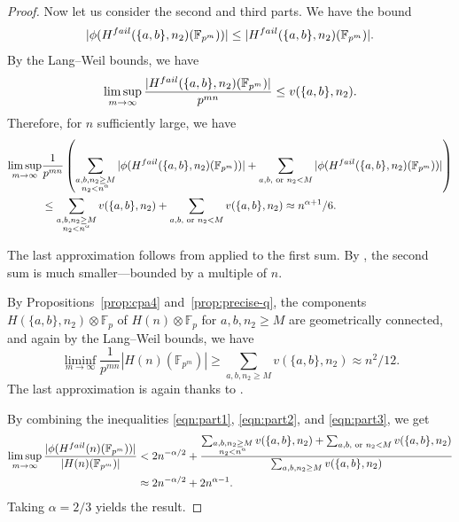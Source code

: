 \documentclass[10pt,a4paper]{amsart}
\newcommand\FF{\mathbb{F}}
\begin{document}
\begin{proof}
  Now let us consider the second and third parts.
  We have the bound
  \[|\phi (H^{\rm fail}(\{a,b\},n_2)(\FF_{p^m}))| \leq |H^{\rm fail}(\{a,b\},n_2)(\FF_{p^m})|.\]
  By the Lang--Weil bounds, we have
  \[ \limsup_{m \to \infty} \frac{|H^{\rm fail}(\{a,b\},n_2)(\FF_{p^m})|}{p^{mn}} \leq v(\{a,b\},n_2).\]
  Therefore, for $n$ sufficiently large, we have
\begin{equation}\label{eqn:part2}
    \begin{split}
      \limsup_{m \to \infty} &\frac{1}{p^{mn}}\left(\sum_{\substack{a, b, n_2 \geq M\\ n_2 < n^{\alpha}}} |\phi (H^{\rm fail}(\{a,b\},n_2)(\FF_{p^m}))| + \sum_{a,b,\text{ or } n_2 < M} |\phi (H^{\rm fail}(\{a,b\},n_2)(\FF_{p^m}))| \right) \\
      & \leq \sum_{\substack{a, b, n_2 \geq M\\ n_2 < n^{\alpha}}} v(\{a,b\},n_2) + \sum_{a,b,\text{ or } n_2 < M} v(\{a,b\},n_2) \approx n^{\alpha+1}/6.
    \end{split}
  \end{equation}

  
  The last approximation follows from  applied to the first sum.
  By , the second sum is much smaller---bounded by a multiple of \(n\).

  By Propositions~\ref{prop:cpa4} and~\ref{prop:precise-q}, the components \(H(\{a,b\},n_2) \otimes \FF_p\) of \(H(n) \otimes \FF_p\) for \(a,b,n_2 \geq M\) are geometrically connected, and again by the Lang--Weil bounds, we have
  \begin{equation}\label{eqn:part3}
    \liminf_{m \to \infty} \frac{1}{p^{mn}} |H(n)(\FF_{p^m})| \geq \sum_{a,b,n_2 \geq M} v(\{a,b\},n_2) \approx n^2/12.
  \end{equation}
  The last approximation is again thanks to .

  By combining the inequalities \eqref{eqn:part1}, \eqref{eqn:part2}, and \eqref{eqn:part3}, we get
  \begin{equation}
    \begin{split}
      \limsup_{m \to \infty} \frac{|\phi(H^{\rm fail}(n)(\FF_{p^m}))|}{|H(n)(\FF_{p^m})|} &< 2n^{-\alpha/2} + \frac{\sum_{\substack{a, b, n_2 \geq M\\ n_2 < n^{\alpha}}} v(\{a,b\},n_2) + \sum_{a,b,\text{ or } n_2 < M} v(\{a,b\},n_2)}{\sum_{a,b,n_2 \geq M}v(\{a,b\},n_2)}\\
      &\approx 2n^{-\alpha/2} + 2 n^{\alpha - 1}.
    \end{split}
  \end{equation}
Taking \(\alpha = 2/3\) yields the result.
\end{proof}
\end{document}
